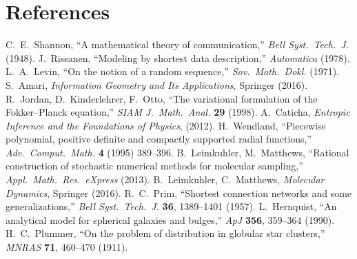\documentclass[11pt,a4paper]{article}
\numberwithin{equation}{section}
\begin{document}
\section*{References}
\begin{thebibliography}{12}
C.\ E.\ Shannon, ``A mathematical theory of communication,'' \emph{Bell Syst.\ Tech.\ J.} (1948).
J.\ Rissanen, ``Modeling by shortest data description,'' \emph{Automatica} (1978).
L.\ A.\ Levin, ``On the notion of a random sequence,'' \emph{Sov.\ Math.\ Dokl.} (1971).
S.\ Amari, \emph{Information Geometry and Its Applications}, Springer (2016).
R.\ Jordan, D.\ Kinderlehrer, F.\ Otto, ``The variational formulation of the Fokker–Planck equation,'' \emph{SIAM J.\ Math.\ Anal.} \textbf{29} (1998).
A.\ Caticha, \emph{Entropic Inference and the Foundations of Physics}, (2012).
H.\ Wendland, ``Piecewise polynomial, positive definite and compactly supported radial functions,'' \emph{Adv.\ Comput.\ Math.} \textbf{4} (1995) 389--396.
B.\ Leimkuhler, M.\ Matthews, ``Rational construction of stochastic numerical methods for molecular sampling,'' \emph{Appl.\ Math.\ Res.\ eXpress} (2013).
B.\ Leimkuhler, C.\ Matthews, \emph{Molecular Dynamics}, Springer (2016).
R.\ C.\ Prim, ``Shortest connection networks and some generalizations,'' \emph{Bell Syst.\ Tech.\ J.} \textbf{36}, 1389--1401 (1957).
L.\ Hernquist, ``An analytical model for spherical galaxies and bulges,'' \emph{ApJ} \textbf{356}, 359--364 (1990).
H.\ C.\ Plummer, ``On the problem of distribution in globular star clusters,'' \emph{MNRAS} \textbf{71}, 460--470 (1911).
\end{thebibliography}
\end{document}
